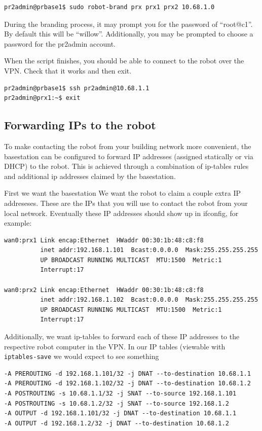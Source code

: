 \begin{verbatim}
pr2admin@prbase1$ sudo robot-brand prx prx1 prx2 10.68.1.0
\end{verbatim}

During the branding process, it may prompt you for the password of
``root@c1''.  By default this will be ``willow''.  Additionally, you
may be prompted to choose a password for the pr2admin account.

When the script finishes, you should be able to connect to the robot
over the VPN.  Check that it works and then exit.
\begin{verbatim}
pr2admin@prbase1$ ssh pr2admin@10.68.1.1
pr2admin@prx1:~$ exit
\end{verbatim}

\subsection{Forwarding IPs to the robot}

To make contacting the robot from your building network more
convenient, the basestation can be configured to forward IP addresses
(assigned statically or via DHCP) to the robot.  This is achieved
through a combination of ip-tables rules and additional ip addresses
claimed by the basestation.

First we want the basestation We want the robot to claim a couple
extra IP addreseses.  These are the IPs that you will use to contact
the robot from your local network.  Eventually these IP addresses
should show up in ifconfig, for example:
\begin{verbatim}
wan0:prx1 Link encap:Ethernet  HWaddr 00:30:1b:48:c8:f8  
          inet addr:192.168.1.101  Bcast:0.0.0.0  Mask:255.255.255.255
          UP BROADCAST RUNNING MULTICAST  MTU:1500  Metric:1
          Interrupt:17 

wan0:prx2 Link encap:Ethernet  HWaddr 00:30:1b:48:c8:f8  
          inet addr:192.168.1.102  Bcast:0.0.0.0  Mask:255.255.255.255
          UP BROADCAST RUNNING MULTICAST  MTU:1500  Metric:1
          Interrupt:17 
\end{verbatim}

Additionally, we want ip-tables to forward each of these IP addresses
to the respective robot computer in the VPN.  In our IP tables
(viewable with \texttt{iptables-save} we would expect to see something
\begin{verbatim}
-A PREROUTING -d 192.168.1.101/32 -j DNAT --to-destination 10.68.1.1 
-A PREROUTING -d 192.168.1.102/32 -j DNAT --to-destination 10.68.1.2
-A POSTROUTING -s 10.68.1.1/32 -j SNAT --to-source 192.168.1.101 
-A POSTROUTING -s 10.68.1.2/32 -j SNAT --to-source 192.168.1.2 
-A OUTPUT -d 192.168.1.101/32 -j DNAT --to-destination 10.68.1.1 
-A OUTPUT -d 192.168.1.2/32 -j DNAT --to-destination 10.68.1.2 
\end{verbatim}

